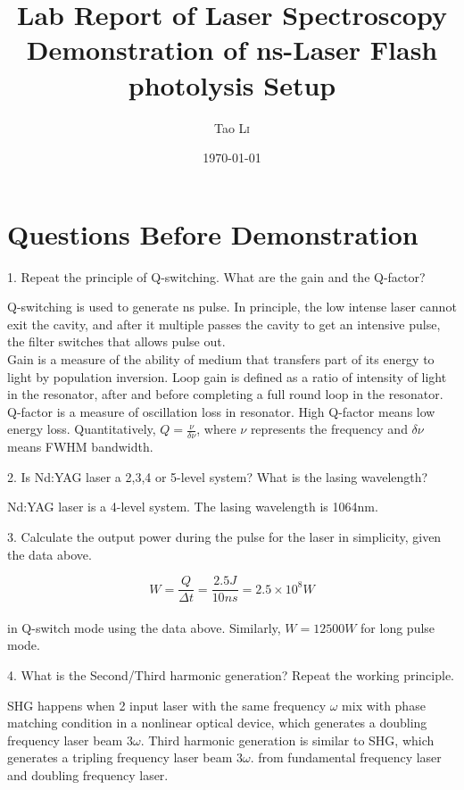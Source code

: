 \documentclass{article}
\title{Lab Report of Laser Spectroscopy \\ Demonstration of ns-Laser Flash photolysis Setup} %
\author{Tao \textsc{Li}} %
\date{\today} %
\begin{document}
\maketitle %



\section{Questions Before Demonstration}
1. Repeat the principle of Q-switching. What are the gain and the Q-factor?\par
Q-switching is used to generate ns pulse. In principle, the low intense laser cannot exit the cavity, and after it multiple passes the cavity to get an intensive pulse, the filter switches that allows pulse out.   \\
Gain is a measure of the ability of medium that transfers part of its energy to light by population inversion. Loop gain is defined as a ratio of intensity of light in the resonator, after and before completing a full round loop in the resonator. Q-factor is a measure of oscillation loss in resonator. High Q-factor means low energy loss. Quantitatively, $Q=\frac{\nu}{\delta \nu}$, where $\nu$ represents the frequency and $\delta \nu$ means FWHM bandwidth.\\
\par
2. Is Nd:YAG laser a 2,3,4 or 5-level system? What is the lasing wavelength?\par 
Nd:YAG laser is a 4-level system. The lasing wavelength is 1064nm.\\
\par 
3. Calculate the output power during the pulse for the laser in simplicity, given the data above. \par 
\begin{equation*}
W=\frac{Q}{\Delta t}=\frac{2.5J}{10ns}=2.5\times 10^8 W
\end{equation*} \\
in Q-switch mode using the data above. Similarly, $W=12500W$ for long pulse mode.
\par 
4. What is the Second/Third harmonic generation? Repeat the working principle.\par 
SHG happens when 2 input laser with the same frequency $\omega$ mix with phase matching condition in a nonlinear optical device, which generates a doubling frequency laser beam $3\omega$. Third harmonic generation is similar to SHG, which generates a tripling frequency laser beam $3\omega$. from fundamental frequency laser and doubling frequency laser.\\
\end{document}
